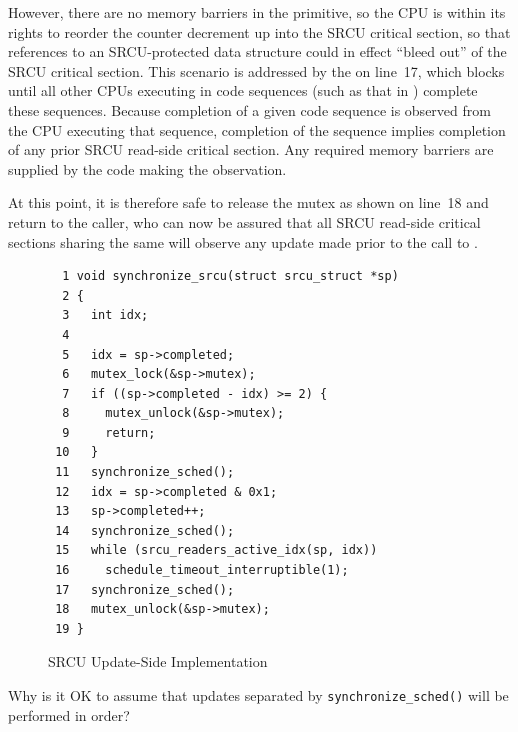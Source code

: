 However, there are no memory barriers in the 
primitive, so the CPU is within its rights to reorder the counter
decrement up into the SRCU critical section, so that references to
an SRCU-protected data structure could in effect ``bleed out'' of the
SRCU critical section.
This scenario is addressed by the  on line~17,
which blocks until all other CPUs executing in 
code sequences (such as that in ) complete these
sequences.
Because completion of a given  code sequence
is observed from the CPU executing that sequence, completion of the
sequence implies completion of any prior SRCU read-side critical section.
Any required memory barriers are supplied by the code making the
observation.

At this point, it is therefore safe to release the mutex as shown
on line~18 and return to the caller, who can now be assured that
all SRCU read-side critical sections sharing the same
 
will observe any update made prior to the call to .

\begin{figure}[htbp]
{ \scriptsize
\begin{verbatim}
  1 void synchronize_srcu(struct srcu_struct *sp)
  2 {
  3   int idx;
  4
  5   idx = sp->completed;
  6   mutex_lock(&sp->mutex);
  7   if ((sp->completed - idx) >= 2) {
  8     mutex_unlock(&sp->mutex);
  9     return;
 10   }
 11   synchronize_sched();
 12   idx = sp->completed & 0x1;
 13   sp->completed++;
 14   synchronize_sched();
 15   while (srcu_readers_active_idx(sp, idx))
 16     schedule_timeout_interruptible(1);
 17   synchronize_sched();
 18   mutex_unlock(&sp->mutex);
 19 }
\end{verbatim}
}
\caption{SRCU Update-Side Implementation}
\label{fig:app:rcuimpl:Update-Side Implementation}
\end{figure}

\QuickQuiz{}
	Why is it OK to assume that updates separated by
	{\tt synchronize\_sched()} will be performed in order?
 \QuickQuizEnd

